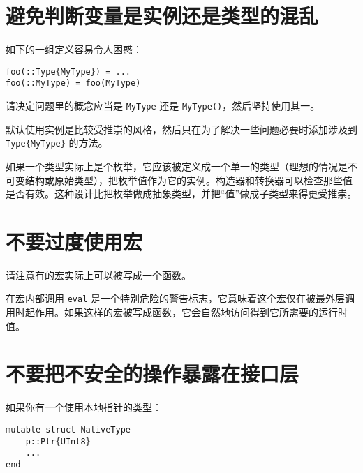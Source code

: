 \section{避免判断变量是实例还是类型的混乱}



如下的一组定义容易令人困惑：




\begin{verbatim}
foo(::Type{MyType}) = ...
foo(::MyType) = foo(MyType)
\end{verbatim}



请决定问题里的概念应当是 \texttt{MyType} 还是 \texttt{MyType()}，然后坚持使用其一。



默认使用实例是比较受推崇的风格，然后只在为了解决一些问题必要时添加涉及到 \texttt{Type\{MyType\}} 的方法。



如果一个类型实际上是个枚举，它应该被定义成一个单一的类型（理想的情况是不可变结构或原始类型），把枚举值作为它的实例。构造器和转换器可以检查那些值是否有效。这种设计比把枚举做成抽象类型，并把“值”做成子类型来得更受推崇。



\hypertarget{678667303123676019}{}


\section{不要过度使用宏}



请注意有的宏实际上可以被写成一个函数。



在宏内部调用 \hyperlink{7507639810592563424}{\texttt{eval}} 是一个特别危险的警告标志，它意味着这个宏仅在被最外层调用时起作用。如果这样的宏被写成函数，它会自然地访问得到它所需要的运行时值。



\hypertarget{9477312169098625763}{}


\section{不要把不安全的操作暴露在接口层}



如果你有一个使用本地指针的类型：




\begin{verbatim}
mutable struct NativeType
    p::Ptr{UInt8}
    ...
end
\end{verbatim}



